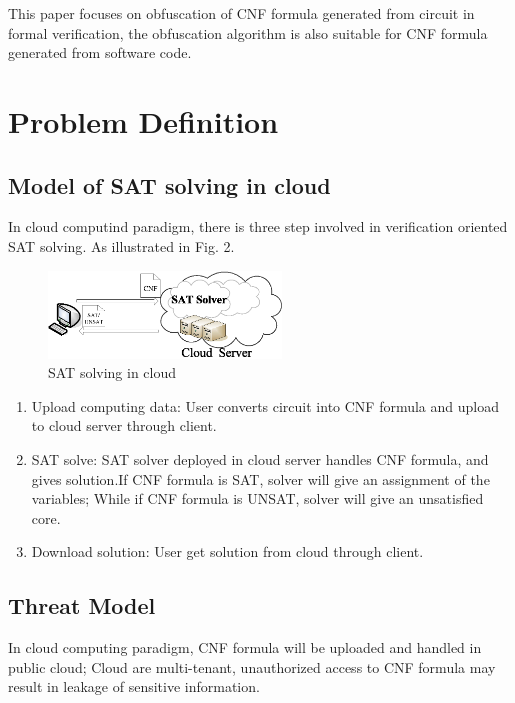\documentclass[runningheads,a4paper]{llncs}
\begin{document}
This paper focuses on obfuscation of CNF formula generated from circuit in formal verification, the obfuscation algorithm is also suitable for CNF formula generated from software code.

\section{Problem Definition}
\subsection{Model of SAT solving in cloud}

In cloud computind paradigm, there is three step involved in verification oriented SAT solving\cite{t37}.
As illustrated in Fig. 2.
\begin{figure}
\centering
\includegraphics[width=6.2cm]{a2}
\caption{SAT solving in cloud }
\end{figure}

\begin{enumerate}
 \item Upload computing data: User converts circuit into CNF formula and upload to cloud server through client.
 \item SAT solve: SAT solver deployed in cloud server handles CNF formula, and gives solution.If CNF formula is SAT, solver will give an assignment of the variables; While if CNF formula is UNSAT, solver will give an unsatisfied core.{}
 \item Download solution: User get solution from cloud through client.
\end{enumerate}

\subsection{Threat Model}

In cloud computing paradigm, CNF formula will be uploaded and handled in public cloud; 
Cloud are multi-tenant, unauthorized access\cite{t11} to CNF formula may result in leakage of sensitive information.
\end{document}
